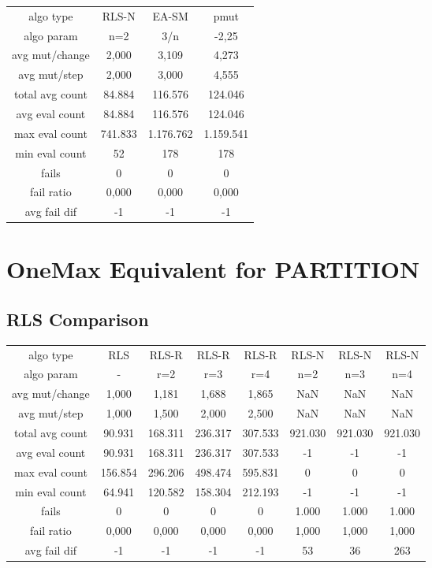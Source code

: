 \begin{tabular}[h]{cccc}
algo type&            RLS-N&     EA-SM&      pmut\\
algo param&             n=2&       3/n&     -2,25\\
avg mut/change&       2,000&     3,109&     4,273\\
avg mut/step&         2,000&     3,000&     4,555\\
\hline
total avg count&     84.884&   116.576&   124.046\\
avg eval count&      84.884&   116.576&   124.046\\
max eval count&     741.833& 1.176.762& 1.159.541\\
min eval count&          52&       178&       178\\
\hline
fails&                    0&         0&         0\\
fail ratio&           0,000&     0,000&     0,000\\
avg fail dif&            -1&        -1&        -1\\
\end{tabular}


\section{OneMax Equivalent for PARTITION}

\subsection{RLS Comparison}


\begin{tabular}[h]{cccccccc}
algo type&            RLS&   RLS-R&   RLS-R&   RLS-R&   RLS-N&   RLS-N&   RLS-N\\
algo param&             -&     r=2&     r=3&     r=4&     n=2&     n=3&     n=4\\
avg mut/change&     1,000&   1,181&   1,688&   1,865&     NaN&     NaN&     NaN\\
avg mut/step&       1,000&   1,500&   2,000&   2,500&     NaN&     NaN&     NaN\\
\hline
total avg count&   90.931& 168.311& 236.317& 307.533& 921.030& 921.030& 921.030\\
avg eval count&    90.931& 168.311& 236.317& 307.533&      -1&      -1&      -1\\
max eval count&   156.854& 296.206& 498.474& 595.831&       0&       0&       0\\
min eval count&    64.941& 120.582& 158.304& 212.193&      -1&      -1&      -1\\
\hline
fails&                  0&       0&       0&       0&   1.000&   1.000&   1.000\\
fail ratio&         0,000&   0,000&   0,000&   0,000&   1,000&   1,000&   1,000\\
avg fail dif&          -1&      -1&      -1&      -1&      53&      36&     263\\
\end{tabular}

